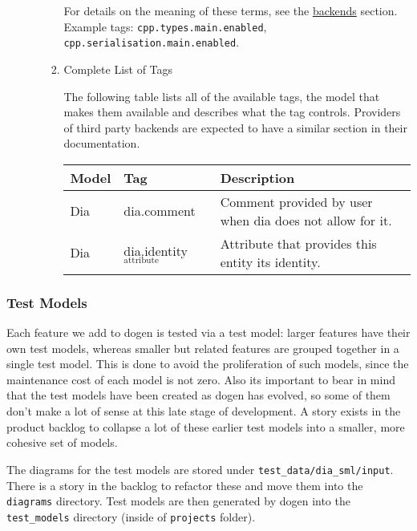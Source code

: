 \documentclass[11pt]{article}
\begin{document}
\begin{enumerate}
\begin{enumerate}
\begin{enumerate}
For details on the meaning of these terms, see the \href{https://github.com/DomainDrivenConsulting/dogen/blob/master/doc/manual/manual.org#the-backends}{backends}
section. Example tags: \texttt{cpp.types.main.enabled},
\texttt{cpp.serialisation.main.enabled}.

\item Complete List of Tags
\label{sec-2-2-1-2-4-3}

The following table lists all of the available tags, the model that
makes them available and describes what the tag controls. Providers of
third party backends are expected to have a similar section in their
documentation.

\begin{center}
\begin{tabular}{lll}
Model & Tag & Description\\
\hline
Dia & dia.comment & Comment provided by user when dia does not allow for it.\\
Dia & dia.identity$_{\text{attribute}}$ & Attribute that provides this entity its identity.\\
\end{tabular}
\end{center}
\end{enumerate}
\end{enumerate}
\end{enumerate}

\subsubsection{Test Models}
\label{sec-2-2-2}

Each feature we add to dogen is tested via a test model: larger
features have their own test models, whereas smaller but related
features are grouped together in a single test model. This is done to
avoid the proliferation of such models, since the maintenance cost of
each model is not zero. Also its important to bear in mind that the
test models have been created as dogen has evolved, so some of them
don't make a lot of sense at this late stage of development. A story
exists in the product backlog to collapse a lot of these earlier test
models into a smaller, more cohesive set of models.

The diagrams for the test models are stored under
\texttt{test\_data/dia\_sml/input}. There is a story in the backlog to refactor
these and move them into the \texttt{diagrams} directory. Test models are
then generated by dogen into the \texttt{test\_models} directory (inside of
\texttt{projects} folder).
\end{document}
